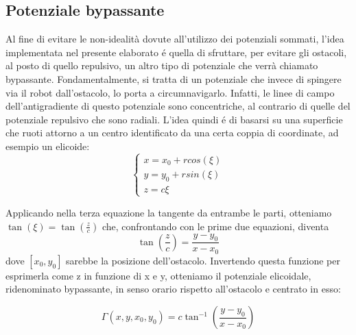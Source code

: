 \documentclass[14pt,a4paper]{extarticle}
\begin{document}
\subsection{Potenziale bypassante}
Al fine di evitare le non-idealità dovute all'utilizzo dei potenziali sommati, l'idea implementata nel presente elaborato é quella di sfruttare, per evitare gli ostacoli, al posto di quello repulsivo, un altro tipo di potenziale che verrà chiamato bypassante. Fondamentalmente, si tratta di un potenziale che invece di spingere via il robot dall'ostacolo, lo porta a circumnavigarlo. Infatti, le linee di campo dell'antigradiente di questo potenziale sono concentriche, al contrario di quelle del potenziale repulsivo che sono radiali. L'idea quindi é di basarsi su una superficie che ruoti attorno a un centro identificato da una certa coppia di coordinate, ad esempio un elicoide:
\[
\begin{cases}
x = x_0 + r cos(\xi) \\
y = y_0 + r sin(\xi)  \\
z = c \xi
\end{cases}
\]

Applicando nella terza equazione la tangente da entrambe le parti, otteniamo \(\tan(\xi)=\tan(\frac{z}{c})\) che, confrontando con le prime due equazioni, diventa
\[\tan \left( \frac{z}{c} \right) = \frac{y-y_0}{x-x_0}\] dove \([x_0,y_0]\) sarebbe la posizione dell'ostacolo. Invertendo questa funzione per esprimerla come z in funzione di x e y, otteniamo il potenziale elicoidale, ridenominato bypassante, in senso orario rispetto all'ostacolo e centrato in esso:

\begin{equation}
\label{potBeq}
\Gamma(x,y,x_0,y_0) = c\tan^{-1} \left( \frac{y-y_0}{x-x_0} \right)
\end{equation}
\end{document}
